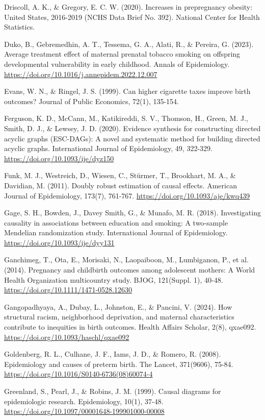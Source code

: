 \documentclass[11pt,letterpaper]{article}
\begin{document}
{Driscoll, A. K., \& Gregory, E. C. W. (2020). Increases in prepregnancy obesity: United States, 2016-2019 (NCHS Data Brief No. 392). National Center for Health Statistics.

Duko, B., Gebremedhin, A. T., Tessema, G. A., Alati, R., \& Pereira, G. (2023). Average treatment effect of maternal prenatal tobacco smoking on offspring developmental vulnerability in early childhood. Annals of Epidemiology. \url{https://doi.org/10.1016/j.annepidem.2022.12.007}

Evans, W. N., \& Ringel, J. S. (1999). Can higher cigarette taxes improve birth outcomes? Journal of Public Economics, 72(1), 135-154.

Ferguson, K. D., McCann, M., Katikireddi, S. V., Thomson, H., Green, M. J., Smith, D. J., \& Lewsey, J. D. (2020). Evidence synthesis for constructing directed acyclic graphs (ESC-DAGs): A novel and systematic method for building directed acyclic graphs. International Journal of Epidemiology, 49, 322-329. \url{https://doi.org/10.1093/ije/dyz150}

Funk, M. J., Westreich, D., Wiesen, C., Stürmer, T., Brookhart, M. A., \& Davidian, M. (2011). Doubly robust estimation of causal effects. American Journal of Epidemiology, 173(7), 761-767. \url{https://doi.org/10.1093/aje/kwq439}

Gage, S. H., Bowden, J., Davey Smith, G., \& Munafo, M. R. (2018). Investigating causality in associations between education and smoking: A two-sample Mendelian randomization study. International Journal of Epidemiology. \url{https://doi.org/10.1093/ije/dyy131}

Ganchimeg, T., Ota, E., Morisaki, N., Laopaiboon, M., Lumbiganon, P., et al. (2014). Pregnancy and childbirth outcomes among adolescent mothers: A World Health Organization multicountry study. BJOG, 121(Suppl. 1), 40-48. \url{https://doi.org/10.1111/1471-0528.12630}

Gangopadhyaya, A., Dubay, L., Johnston, E., \& Pancini, V. (2024). How structural racism, neighborhood deprivation, and maternal characteristics contribute to inequities in birth outcomes. Health Affairs Scholar, 2(8), qxae092. \url{https://doi.org/10.1093/haschl/qxae092}

Goldenberg, R. L., Culhane, J. F., Iams, J. D., \& Romero, R. (2008). Epidemiology and causes of preterm birth. The Lancet, 371(9606), 75-84. \url{https://doi.org/10.1016/S0140-6736(08)60074-4}

Greenland, S., Pearl, J., \& Robins, J. M. (1999). Causal diagrams for epidemiologic research. Epidemiology, 10(1), 37-48. \url{https://doi.org/10.1097/00001648-199901000-00008}

}
\end{document}
